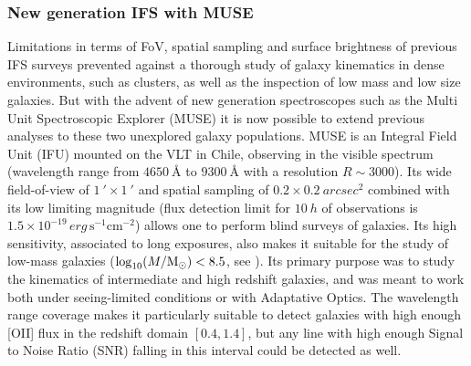\subsubsection{New generation IFS with MUSE}

Limitations in terms of FoV, spatial sampling and surface brightness of previous IFS surveys prevented against a thorough study of galaxy kinematics in dense environments, such as clusters, as well as the inspection of low mass and low size galaxies. But with the advent of new generation spectroscopes such as the Multi Unit Spectroscopic Explorer (MUSE)  it is now possible to extend previous analyses to these two unexplored galaxy populations. MUSE is an Integral Field Unit (IFU) mounted on the VLT in Chile, observing in the visible spectrum (wavelength range from $\SI{4650}{\angstrom}$ to $\SI{9300}{\angstrom}$ with a resolution $R \sim 3000$). Its wide field-of-view of $\SI{1}{\arcmin} \times \SI{1}{\arcmin}$ and spatial sampling of $0.2 \times \SI{0.2}{arcsec^2}$ combined with its low limiting magnitude (flux detection limit for $\SI{10}{h}$ of observations is $1.5 \times 10^{-19} \, \si{erg \, \second^{-1} \centi\meter^{-2}}$) allows one to perform blind surveys of galaxies. Its high sensitivity, associated to long exposures, also makes it suitable for the study of low-mass galaxies ($\log_{10} (M / \rm{M_{\odot}}) < 8.5$, see ). Its primary purpose was to study the kinematics of intermediate and high redshift galaxies, and was meant to work both under seeing-limited conditions or with Adaptative Optics. The wavelength range coverage makes it particularly suitable to detect galaxies with high enough [OII] flux in the redshift domain $[0.4 , 1.4]$, but any line with high enough Signal to Noise Ratio (SNR) falling in this interval could be detected as well.